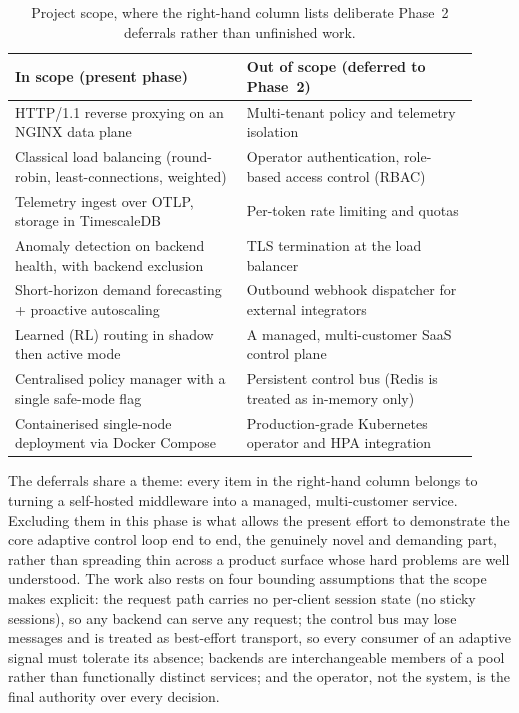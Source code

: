 \begin{table}[H]
\centering
\caption[Project scope and Phase 2 deferrals]{Project scope, where the right-hand column lists deliberate Phase~2 deferrals rather than unfinished work.}
\label{dsa:tab:scope}
\small
\begin{tabular}{@{}p{0.46\linewidth}p{0.46\linewidth}@{}}
\toprule
\textbf{In scope (present phase)} & \textbf{Out of scope (deferred to Phase~2)} \\
\midrule
HTTP/1.1 reverse proxying on an NGINX data plane &
Multi-tenant policy and telemetry isolation \\
Classical load balancing (round-robin, least-connections, weighted) &
Operator authentication, role-based access control (RBAC) \\
Telemetry ingest over OTLP, storage in TimescaleDB &
Per-token rate limiting and quotas \\
Anomaly detection on backend health, with backend exclusion &
TLS termination at the load balancer \\
Short-horizon demand forecasting + proactive autoscaling &
Outbound webhook dispatcher for external integrators \\
Learned (RL) routing in shadow then active mode &
A managed, multi-customer SaaS control plane \\
Centralised policy manager with a single safe-mode flag &
Persistent control bus (Redis is treated as in-memory only) \\
Containerised single-node deployment via Docker Compose &
Production-grade Kubernetes operator and HPA integration \\
\bottomrule
\end{tabular}
\end{table}

The deferrals share a theme: every item in the right-hand column belongs to turning
a self-hosted middleware into a managed, multi-customer service. Excluding them in
this phase is what allows the present effort to demonstrate the core adaptive
control loop end to end, the genuinely novel and demanding part, rather than
spreading thin across a product surface whose hard problems are well understood.
The work also rests on four bounding assumptions that the scope makes explicit: the
request path carries no per-client session state (no sticky sessions), so any
backend can serve any request; the control bus may lose messages and is treated as
best-effort transport, so every consumer of an adaptive signal must tolerate its
absence; backends are interchangeable members of a pool rather than functionally
distinct services; and the operator, not the system, is the final authority over
every decision.

